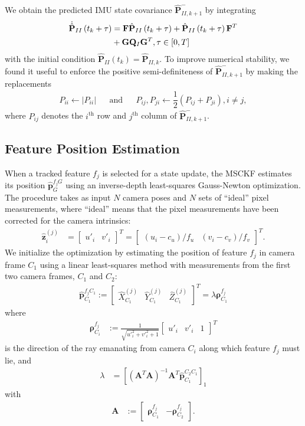\documentclass[letterpaper, 10 pt, conference]{ieeeconf}  %
\def\Vec#1{\mathbf{#1}}
\newcommand{\bbm}{\begin{bmatrix}}
\newcommand{\ebm}{\end{bmatrix}}
\begin{document}
We obtain the predicted IMU state covariance $\hat{\Vec{P}}^-_{II,k+1}$ by integrating
\begin{align} \label{eq:imucovar}
    \dot{\hat{\Vec{P}}}_{II}\left(t_k  + \tau \right) &= \Vec{F} \hat{\Vec{P}}_{II}\left(t_k  + \tau \right) 
                 + \hat{\Vec{P}}_{II}\left(t_k  + \tau \right) \Vec{F}^T \notag \\ 
                & + \Vec{G} \Vec{Q}_I \Vec{G}^T, \tau\in\left[0,T\right]
\end{align}
with the initial condition $\hat{\Vec{P}}_{II}\left(t_k\right) = \hat{\Vec{P}}_{II,k}$. 
To improve numerical stability, we found it useful to enforce the positive semi-definiteness of $\hat{\Vec{P}}^-_{II,k+1}$ by making the replacements
\begin{align*}
    P_{ii} \leftarrow |P_{ii}| && \text{and} && P_{ij}, P_{ji} \leftarrow \dfrac{1}{2}\left(P_{ij} + P_{ji}\right), i\neq j,
\end{align*}
where $P_{ij}$ denotes the $i^\text{th}$ row and $j^\text{th}$ column of $\hat{\Vec{P}}^-_{II,k+1}$.

\subsection{Feature Position Estimation}
\label{sec:featPosinvDepth}
When a tracked feature $f_j$ is selected for a state update, the MSCKF estimates its position $\hat{\Vec{p}}_G^{f_j G}$ using an inverse-depth least-squares Gauss-Newton optimization. 
The procedure takes as input $N$ camera poses and $N$ sets of ``ideal'' pixel measurements, where ``ideal'' means that the pixel measurements have been corrected for the camera intrinsics:
\begin{align}
\hat{\Vec{z}}_i^{(j)} &= \bbm u'_i & v'_i \ebm ^T = \bbm (u_i - c_u)/f_u & (v_i - c_v)/f_v \ebm ^T.
\end{align}
We initialize the optimization by estimating the position of feature $f_j$ in camera frame $C_1$ using a linear least-squares method with measurements from the first two camera frames, $C_1$ and $C_2$:
\begin{align}
\hat{\Vec{p}}_{C_1}^{f_j C_1} := \bbm \hat{X}^{(j)}_{C_1} & \hat{Y}^{(j)}_{C_1} & \hat{Z}^{(j)}_{C_1} \ebm ^T = \lambda \boldsymbol{\rho}_{C_1}^{f_j}
\end{align}
where
\begin{align}
\boldsymbol{\rho}_{C_i}^{f_j} &:= \frac{1}{\sqrt{u'^2_i + v'^2_i + 1}}\bbm u'_i & v'_i & 1\ebm^T
\end{align}
is the direction of the ray emanating from camera $C_i$ along which feature $f_j$ must lie, and
\begin{align}
\lambda &= \left[(\Vec A^T \Vec A)^{-1} \Vec A^T \hat{\Vec{p}}_{C_1}^{C_2 C_1} \right]_1
\end{align}
with
\begin{align}
\Vec A &:= \bbm \boldsymbol{\rho}_{C_1}^{f_j} & -\boldsymbol{\rho}_{C_2}^{f_j} \ebm.
\end{align}
\end{document}
